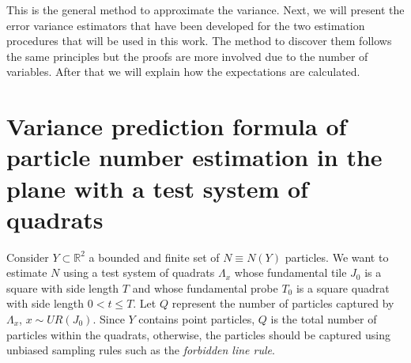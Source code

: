 \vspace{2mm}

This is the general method to approximate the variance. Next, we will present the error variance estimators that have been developed for the two estimation procedures that will be used in this work. The method to discover them follows the same principles but the proofs are more involved due to the number of variables.
After that we will explain how the expectations are calculated.\\



\section{Variance prediction formula of particle number estimation in the plane with a test system of quadrats}

Consider $Y\subset \mathbb{R}^2$ a bounded and finite set of $N\equiv N(Y)$ particles. We want to estimate $N$ using a test system of quadrats $\Lambda_x$ whose fundamental tile $J_0$ is a square with side length $T$ and whose fundamental probe $T_0$ is a square quadrat with side length $0<t\leq T$. Let $Q$ represent the number of particles captured by $\Lambda_x$, $x\sim UR(J_0)$. Since $Y$ contains point particles, $Q$ is the total number of particles within the quadrats, otherwise, the particles should be captured using unbiased sampling rules such as the \textit{forbidden line rule}.\\

